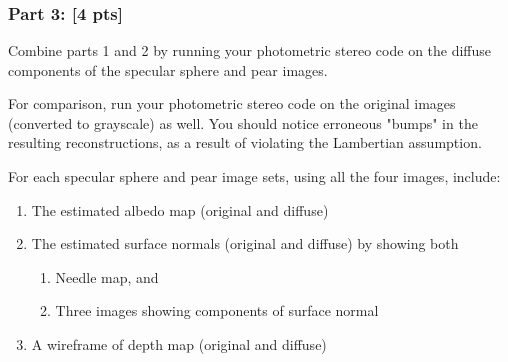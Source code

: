 \documentclass[11pt]{article}
\providecommand{\tightlist}{%
      \setlength{\itemsep}{0pt}\setlength{\parskip}{0pt}}
\begin{document}
    \begin{center}
    \end{center}
    { \hspace*{\fill} \\}
    
    \begin{center}
    \end{center}
    { \hspace*{\fill} \\}
    
    \begin{center}
    \end{center}
    { \hspace*{\fill} \\}
    
    \subsubsection{Part 3: {[}4 pts{]}}\label{part-3-4-pts}

Combine parts 1 and 2 by running your photometric stereo code on the
diffuse components of the specular sphere and pear images.

For comparison, run your photometric stereo code on the original images
(converted to grayscale) as well. You should notice erroneous "bumps" in
the resulting reconstructions, as a result of violating the Lambertian
assumption.

For each specular sphere and pear image sets, using all the four images,
include:

\begin{enumerate}
\def\labelenumi{\arabic{enumi}.}
\item
  The estimated albedo map (original and diffuse)
\item
  The estimated surface normals (original and diffuse) by showing both

  \begin{enumerate}
  \def\labelenumii{\arabic{enumii}.}
  \tightlist
  \item
    Needle map, and
  \item
    Three images showing components of surface normal
  \end{enumerate}
\item
  A wireframe of depth map (original and diffuse)
\end{enumerate}
\end{document}
